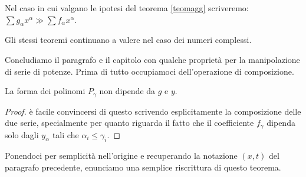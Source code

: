 Nel caso in cui valgano le ipotesi del teorema \ref{teomagg} scriveremo:  $\sum g_\alpha x^\alpha \gg \sum f_\alpha x^\alpha$.

\begin{remark}
Gli stessi teoremi continuano a valere nel caso dei numeri complessi.
\end{remark}

Concludiamo il paragrafo e il capitolo con qualche proprietà per la manipolazione di serie di potenze. 
Prima di tutto occupiamoci dell'operazione di composizione.
\begin{theorem}
\end{theorem}
\begin{remark}
La forma dei polinomi $P_\gamma$ non dipende da $g$ e $y$.
\end{remark}
\begin{proof}
è facile convincersi di questo scrivendo esplicitamente la composizione delle due serie, specialmente per quanto riguarda il fatto che il coefficiente $f_\gamma$ dipenda solo dagli $y_\alpha$ tali che $\alpha_i \leq \gamma_i$.
\end{proof}

Ponendoci per semplicità nell'origine e recuperando la notazione $(x,t)$ del paragrafo precedente, enunciamo una semplice riscrittura di questo teorema.
\begin{theorem}[composizione]\label{composizione}
\end{theorem}

